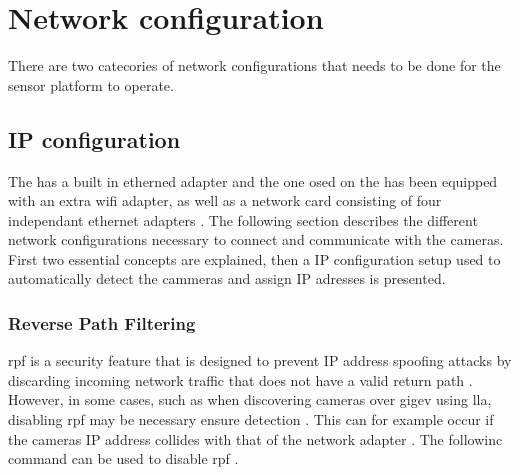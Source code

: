 \section{Network configuration}
\label{sec:network_configuration}
There are two catecories of network configurations that needs to be done for the sensor platform to operate.



\subsection{IP configuration}
The \jx has a built in etherned adapter and the one osed on the \sr has been equipped with an extra wifi adapter, as well as a network card consisting of four independant ethernet adapters \cite{martensPortableSensorRig2022}.
The following section describes the different network configurations necessary to connect and communicate with the cameras. First two essential concepts are explained, then a IP configuration setup used to automatically detect the cammeras and assign IP adresses is presented.


\subsubsection{Reverse Path Filtering}
\gls{rpf} is a security feature that is designed to prevent IP address spoofing attacks by discarding incoming network traffic that does not have a valid return path \cite{ReversePathFiltering}.
However, in some cases, such as when discovering cameras over \gls{gigev} using \gls{lla}, disabling \gls{rpf} may be necessary ensure detection \cite{lucidvisionlabsArenaSoftwareDevelopment2020}. This can for example occur if the cameras IP address collides with that of the network adapter \cite{lucidvisionlabsArenaSoftwareDevelopment2020}. The followinc command can be used to disable \gls{rpf} .

